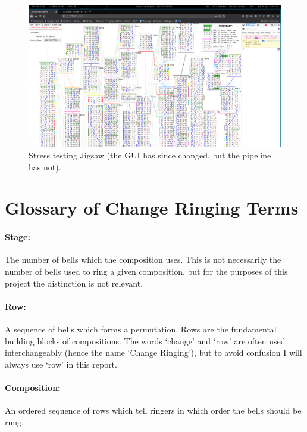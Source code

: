 \documentclass[12pt]{article}
\begin{document}
\begin{figure}
    \centering
    \includegraphics[width=\textwidth]{stress-test}
    \caption{Stress testing Jigsaw (the GUI has since changed, but the pipeline has
    not).}\label{fig:stress-test}
\end{figure}



\pagebreak

\section{Glossary of Change Ringing Terms}

\paragraph{Stage:} The number of bells which the composition uses.  This is not necessarily the
number of bells used to ring a given composition, but for the purposes of this project the
distinction is not relevant.

\paragraph{Row:} A sequence of bells which forms a permutation.  Rows are the fundamental building
blocks of compositions.  The words `change' and `row' are often used interchangeably (hence the name
`Change Ringing'), but to avoid confusion I will always use `row' in this report.

\paragraph{Composition:} An ordered sequence of rows which tell ringers in which order the bells
should be rung.
\end{document}
